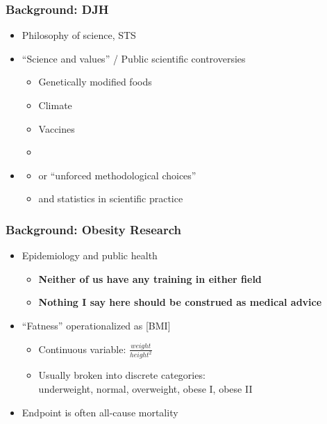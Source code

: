 \documentclass{philslides}
\begin{document}
\frame
{
	\frametitle{Background:  DJH}
	\begin{itemize}
	\item Philosophy of science, STS
	\item ``Science and values'' / Public scientific controversies
		\begin{itemize}
		\item Genetically modified foods \autocite{Hicks2015, Hicks2016a, Hicks2017b}
		\item Climate \autocite{Hicks2017a}
		\item Vaccines \autocite{Hicks2017a}
		\item {}
		 \end{itemize}
	\item {} 
		\begin{itemize}
		\item or ``unforced methodological choices'' \autocite{Winsberg2012} 
		\item and statistics in scientific practice \autocite[Cf][]{Steel2015b}
		\end{itemize}
	\end{itemize}
}
\frame
{
	\frametitle{Background: Obesity Research}
	\begin{itemize}
	\item Epidemiology and public health
		\begin{itemize}
		\item \textbf{Neither of us have any training in either field}
		\item \textbf{Nothing I say here should be construed as medical advice}
		\end{itemize}
	\item ``Fatness'' operationalized as  [BMI]
		\begin{itemize}
		\item Continuous variable:  $\displaystyle \frac{weight}{height^2}$
		\item Usually broken into discrete categories:\\
			underweight, normal, overweight, obese I, obese II
		\end{itemize}
	\item Endpoint is often all-cause mortality
	\end{itemize}
}
\end{document}
